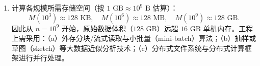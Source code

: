 \begin{exercise}[title={数据规模跃迁与复杂度手算},level=standard,points=15,tags={时间复杂度,大数据规模}]
\begin{solution}
\begin{enumerate}
\begin{itemize}
\[\begin{aligned}
    \end{aligned}\]
    \item 当 $n = 10^9$ 时（$\log_2 n \approx 29.90 \approx 30$）：
    \[\begin{aligned}
      T_A &= \frac{5\times 10^9}{10^8} = 50\text{ s}, &
      T_B &\approx \frac{3\times 10^{10}}{10^8} = 300\text{ s} = 5\text{ min}, \\
      T_C &= \frac{0.5\times 10^{18}}{10^8} = 5\times 10^9\text{ s} \approx \frac{5\times 10^9}{3.15\times 10^7} \approx 158.7\text{ 年}.
    \end{aligned}\]
  \end{itemize}
  \item 计算各规模所需存储空间（按 $1\text{ GB}\approx 10^9\text{ B}$ 估算）：
  \[
    M(10^3) \approx 128\text{ KB},\quad
    M(10^6) \approx 128\text{ MB},\quad
    M(10^9) \approx 128\text{ GB}.
  \]
  因此从 $n = 10^9$ 开始，原始数据体积（$128\text{ GB}$）远超 $16\text{ GB}$ 单机内存。工程上需采用：（a）外存分块/流式读取与小批量（mini-batch）算法；（b）抽样或草图（sketch）等大数据近似分析技术；（c）分布式文件系统与分布式计算框架进行并行处理。
\end{enumerate}
\end{solution}
\end{exercise}


